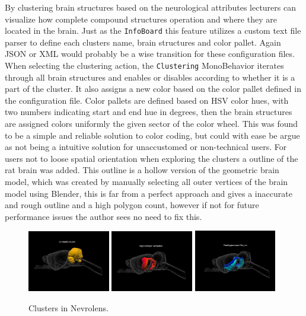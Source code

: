 By clustering brain structures based on the neurological attributes lecturers can visualize how complete compound structures operation and where they are located in the brain. Just as the \texttt{InfoBoard} this feature utilizes a custom text file parser to define each clusters name, brain structures and color pallet. Again JSON or XML would probably be a wise transition for these configuration files. 
When selecting the clustering action, the \texttt{Clustering} MonoBehavior iterates through all brain structures and enables or disables according to whether it is a part of the cluster. It also assigns a new color based on the color pallet defined in the configuration file. Color pallets are defined based on HSV color hues, with two numbers indicating start and end hue in degrees, then the brain structures are assigned colors uniformly the given sector of the color wheel. This was found to be a simple and reliable solution to color coding, but could with ease be argue as not being a intuitive solution for unaccustomed or non-technical users. 
For users not to loose spatial orientation when exploring the clusters a outline of the rat brain was added. This outline is a hollow version of the geometric brain model, which was created by manually selecting all outer vertices of the brain model using Blender, this is far from a perfect approach and gives a inaccurate and rough outline and a high polygon count, however if not for future performance issues the author sees no need to fix this.


\begin{figure}[h]
    \centering
    \includegraphics[width=0.32\textwidth]{fig/cluster1.png}
    \includegraphics[width=0.32\textwidth]{fig/cluster2.png}
    \includegraphics[width=0.32\textwidth]{fig/cluster3.png}
    \caption{Clusters in Nevrolens.}
\end{figure}


